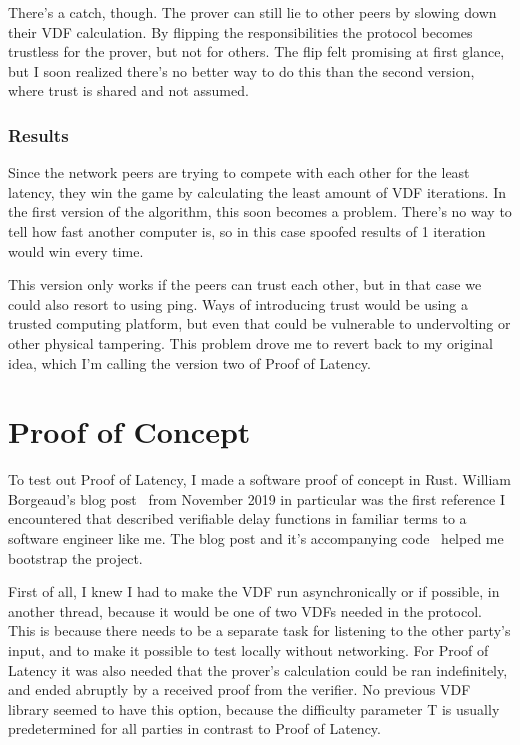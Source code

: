 There's a catch, though. The prover can still lie to other peers by slowing down their VDF calculation. By flipping the responsibilities the protocol becomes trustless for the prover, but not for others. The flip felt promising at first glance, but I soon realized there's no better way to do this than the second version, where trust is shared and not assumed.

\subsection{Results}
Since the network peers are trying to compete with each other for the least latency, they win the game by calculating the least amount of VDF iterations. In the first version of the algorithm, this soon becomes a problem. There's no way to tell how fast another computer is, so in this case spoofed results of 1 iteration would win every time.

This version only works if the peers can trust each other, but in that case we could also resort to using ping. Ways of introducing trust would be using a trusted computing platform, but even that could be vulnerable to undervolting or other physical tampering. This problem drove me to revert back to my original idea, which I'm calling the version two of Proof of Latency.

\chapter{Proof of Concept}
\label{Proof of Concept}
To test out Proof of Latency, I made a software proof of concept in Rust. William Borgeaud's blog post~\cite{Borgeaud2019-wk} from November 2019 in particular was the first reference I encountered that described verifiable delay functions in familiar terms to a software engineer like me. The blog post and it's accompanying code~\cite{Borgeaud2019-wk} helped me bootstrap the project.

First of all, I knew I had to make the VDF run asynchronically or if possible, in another thread, because it would be one of two VDFs needed in the protocol. This is because there needs to be a separate task for listening to the other party's input, and to make it possible to test locally without networking. For Proof of Latency it was also needed that the prover's calculation could be ran indefinitely, and ended abruptly by a received proof from the verifier. No previous VDF library seemed to have this option, because the difficulty parameter T is usually predetermined for all parties in contrast to Proof of Latency.

